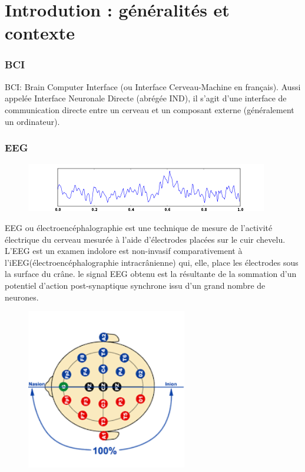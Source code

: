 \part{Introdution : généralités et contexte} %
\label{prt:introduction_ _théorique_}
	
	\section{BCI} %
	\label{sec:intro_bci}
	
	BCI: Brain Computer Interface (ou Interface Cerveau-Machine en français).
	Aussi appelée Interface Neuronale Directe (abrégée IND), il s'agit d'une interface de communication directe entre un cerveau et un composant externe (généralement un ordinateur).

	
	\section{EEG} %
	\label{sec:eeg}
	\begin{figure}[h!]
			\centering
		    \includegraphics []{figures/eeg_1s_signal.png} \\
			\label{fig_eeg_1s}
	\end{figure}
	EEG ou électroencéphalographie est une technique de mesure de l'activité électrique du cerveau mesurée à l'aide d'électrodes placées sur le cuir chevelu. L'EEG est un examen indolore est non-invasif comparativement à l'iEEG(électroencéphalographie intracrânienne) qui, elle, place les électrodes sous la surface du crâne. le signal EEG obtenu est la résultante de la sommation d'un potentiel d'action post-synaptique synchrone issu d'un grand nombre de neurones.
	\begin{figure}
		\centering 
	 	\includegraphics [width=7cm,height=7cm]{figures/captoreeg.png} \\
		\label{fig_captors}	
	\end{figure}

